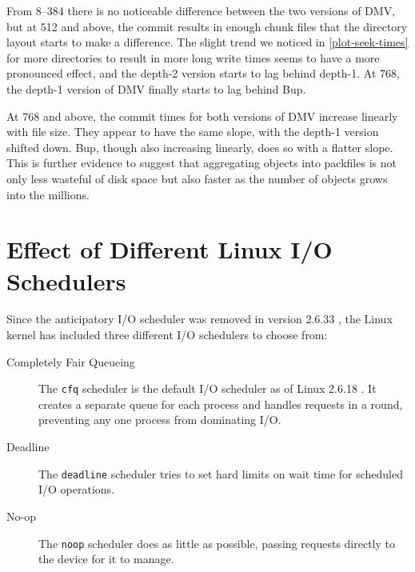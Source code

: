 From \SIrange{8}{384}{\mib} there is no noticeable difference between the two
versions of DMV, but at \SI{512}{\mib} and above, the commit results in enough
chunk files that the directory layout starts to make a difference. The slight
trend we noticed in \autoref{plot-seek-times} for more directories to result in
more long write times seems to have a more pronounced effect, and the
depth-\num{2} version starts to lag behind depth-\num{1}. At \SI{768}{\mib}, the
depth-\num{1} version of DMV finally starts to lag behind Bup.

At \SI{768}{\mib} and above, the commit times for both versions of DMV increase
linearly with file size. They appear to have the same slope, with the
depth-\num{1} version shifted down. Bup, though also increasing linearly, does
so with a flatter slope. This is further evidence to suggest that aggregating
objects into \glspl{packfile} is not only less wasteful of disk space but also
faster as the number of objects grows into the millions.

%



\section{Effect of Different Linux I/O Schedulers}

Since the anticipatory I/O scheduler was removed in version 2.6.33
\cite{as_removed_linux_release_notes}, the Linux kernel has included three
different I/O schedulers to choose from\cite{ioschedulers}:

\begin{description}

    \item[Completely Fair Queueing] The \lstinline{cfq} scheduler is the default
        I/O scheduler as of Linux 2.6.18 \cite{cfq_default_linux_release_notes}.
        It creates a separate queue for each process and handles requests in a
        round, preventing any one process from dominating I/O.

    \item[Deadline] The \lstinline{deadline} scheduler tries to set hard limits
        on wait time for scheduled I/O operations.

    \item[No-op] The \lstinline{noop} scheduler does as little as possible,
        passing requests directly to the device for it to manage.

\end{description}

